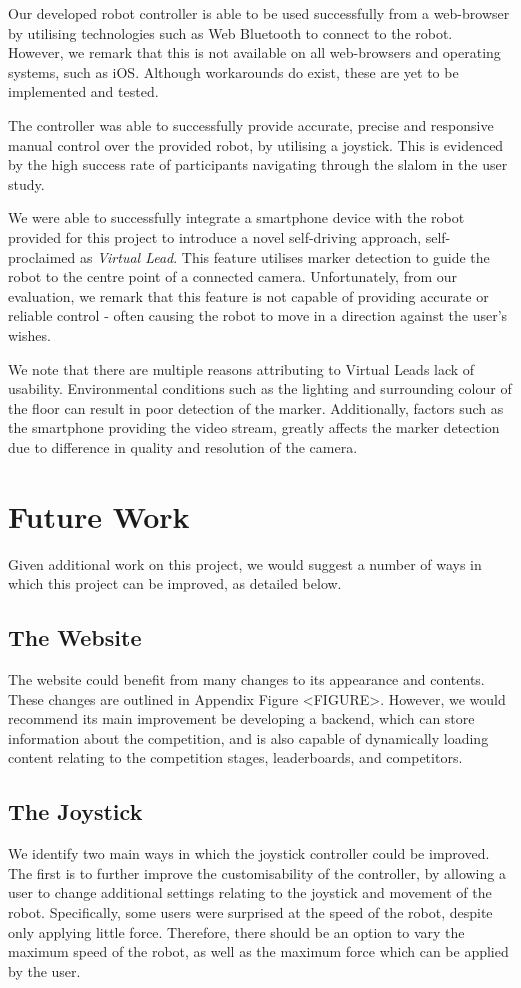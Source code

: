 \documentclass{l4proj}
\begin{document}
Our developed robot controller is able to be used successfully from a web-browser by utilising technologies such as Web Bluetooth to connect to the robot. However, we remark that this is not available on all web-browsers and operating systems, such as iOS. Although workarounds do exist, these are yet to be implemented and tested.

The controller was able to successfully provide accurate, precise and responsive manual control over the provided robot, by utilising a joystick. This is evidenced by the high success rate of participants navigating through the slalom in the user study.

We were able to successfully integrate a smartphone device with the robot provided for this project to introduce a novel self-driving approach, self-proclaimed as \textit{Virtual Lead}. This feature utilises marker detection to guide the robot to the centre point of a connected camera. Unfortunately, from our evaluation, we remark that this feature is not capable of providing accurate or reliable control - often causing the robot to move in a direction against the user's wishes.

We note that there are multiple reasons attributing to Virtual Leads lack of usability. Environmental conditions such as the lighting and surrounding colour of the floor can result in poor detection of the marker. Additionally, factors such as the smartphone providing the video stream, greatly affects the marker detection due to difference in quality and resolution of the camera.

\section{Future Work}
Given additional work on this project, we would suggest a number of ways in which this project can be improved, as detailed below.

\subsection{The Website}
The website could benefit from many changes to its appearance and contents. These changes are outlined in Appendix Figure <FIGURE>. However, we would recommend its main improvement be developing a backend, which can store information about the competition, and is also capable of dynamically loading content relating to the competition stages, leaderboards, and competitors.

\subsection{The Joystick}
We identify two main ways in which the joystick controller could be improved. The first is to further improve the customisability of the controller, by allowing a user to change additional settings relating to the joystick and movement of the robot. Specifically, some users were surprised at the speed of the robot, despite only applying little force. Therefore, there should be an option to vary the maximum speed of the robot, as well as the maximum force which can be applied by the user.
\end{document}
